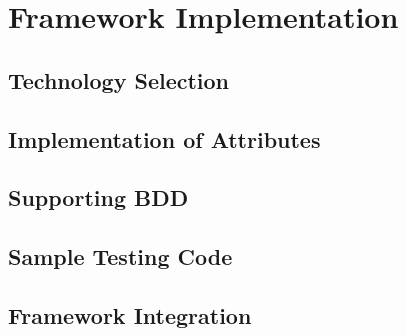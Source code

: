 
\chapter{Framework Implementation\label{chap:framework_implementation}}

\todo{}

\section{Technology Selection}

\todo{}

\section{Implementation of Attributes}

\todo{}

\section{Supporting BDD}


\todo{}


\section{Sample Testing Code}

\todo{}

\section{Framework Integration}
\todo{}